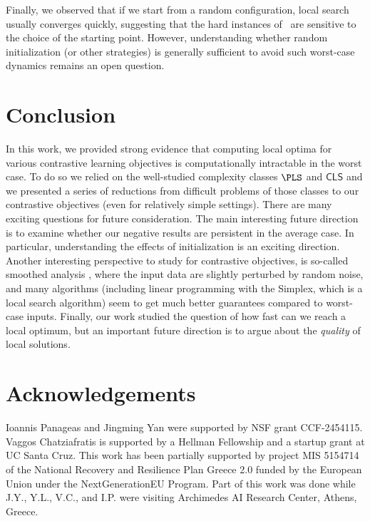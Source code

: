 \documentclass{article}
\theoremstyle{definition}  %
\theoremstyle{plain}
\numberwithin{observation}{section}
\numberwithin{claim}{section}
\numberwithin{fact}{section}
\numberwithin{lemma}{section}
\numberwithin{proposition}{section}
\numberwithin{theorem}{section}
\numberwithin{corollary}{section}
\numberwithin{definition}{section}
\newcommand{\CLS}{\mathsf{CLS}}
\theoremstyle{plain}
\begin{document}
Finally, we observed that if we start from a random configuration, local search usually converges quickly, suggesting that the hard instances of~\citet{monien2010power} are sensitive to the choice of the starting point. However, understanding whether random initialization (or other strategies) is generally sufficient to avoid such worst-case dynamics remains an open question.

\vspace{-0.2cm}
\section*{Conclusion}
In this work, we provided strong evidence that computing local optima for various contrastive learning objectives is computationally intractable in the worst case. To do so we relied on the well-studied complexity classes $\PLS$ and $\CLS$ and we presented a series of reductions from difficult problems of those classes to our contrastive objectives (even for relatively simple settings). There are many exciting questions for future consideration. The main interesting future direction is to examine whether our negative results are persistent in the average case. In particular, understanding the effects of initialization is an exciting direction. Another interesting perspective to study for contrastive objectives, is so-called smoothed analysis \citep{spielman2009smoothed}, where the input data are slightly perturbed by random noise, and many algorithms (including linear programming with the Simplex, which is a local search algorithm) seem to get much better guarantees compared to worst-case inputs. Finally, our work studied the question of how fast can we reach a local optimum, but an important future direction is to argue about the \textit{quality} of local solutions. %




\section*{Acknowledgements}
Ioannis Panageas and Jingming Yan  were supported by NSF grant CCF-2454115. Vaggos Chatziafratis is supported by a Hellman Fellowship and a startup grant at UC Santa Cruz. This work has been partially supported by project MIS 5154714 of the National Recovery and Resilience
Plan Greece 2.0 funded by the European Union under the NextGenerationEU Program.
Part of this work was done while J.Y., Y.L., V.C., and I.P. were visiting Archimedes AI Research Center, Athens, Greece. 
% 

\end{document}
